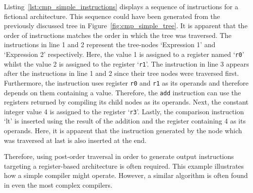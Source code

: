 
Listing~\ref{lst:cmp_simple_instructions} displays a sequence of instructions for a fictional architecture.
This sequence could have been generated from the previously discussed tree in Figure~\ref{fig:cmp_simple_tree}.
It is apparent that the order of instructions matches the order in which the tree was traversed.
The instructions in line 1 and 2 represent the tree-nodes `Expression 1' and `Expression 2' respectively.
Here, the value 1 is assigned to a register named `\texttt{r0}' whilst the value 2 is assigned to the register `\texttt{r1}'.
The  instruction in line 3 appears after the instructions in line 1 and 2 since their tree nodes were traversed first.
Furthermore, the instruction uses register \texttt{r0} and \texttt{r1} as its operands and therefore depends on them containing a value.
Therefore, the \texttt{add} instruction can use the registers returned by compiling its child nodes as its operands.
Next, the constant integer value 4 is assigned to the register `\texttt{r3}'.
Lastly, the comparison instruction `lt' is inserted using the result of the addition and the register containing 4 as its operands.
Here, it is apparent that the instruction generated by the node which was traversed at last is also inserted at the end.

Therefore, using post-order traversal in order to generate output instructions targeting a register-based architecture is often required.
This example illustrates how a simple compiler might operate.
However, a similar algorithm is often found in even the most complex compilers.
